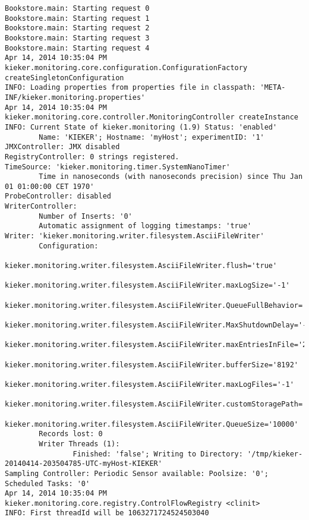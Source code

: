 \setTextListing
\begin{lstlisting}[caption=Execution of the Bookstore with AspectJ trace instrumentation (Section~\ref{sec:traceAnalysis:instr:AspectJ})]
Bookstore.main: Starting request 0
Bookstore.main: Starting request 1
Bookstore.main: Starting request 2
Bookstore.main: Starting request 3
Bookstore.main: Starting request 4
Apr 14, 2014 10:35:04 PM kieker.monitoring.core.configuration.ConfigurationFactory createSingletonConfiguration
INFO: Loading properties from properties file in classpath: 'META-INF/kieker.monitoring.properties'
Apr 14, 2014 10:35:04 PM kieker.monitoring.core.controller.MonitoringController createInstance
INFO: Current State of kieker.monitoring (1.9) Status: 'enabled'
        Name: 'KIEKER'; Hostname: 'myHost'; experimentID: '1'
JMXController: JMX disabled
RegistryController: 0 strings registered.
TimeSource: 'kieker.monitoring.timer.SystemNanoTimer'
        Time in nanoseconds (with nanoseconds precision) since Thu Jan 01 01:00:00 CET 1970'
ProbeController: disabled
WriterController:
        Number of Inserts: '0'
        Automatic assignment of logging timestamps: 'true'
Writer: 'kieker.monitoring.writer.filesystem.AsciiFileWriter'
        Configuration:
                kieker.monitoring.writer.filesystem.AsciiFileWriter.flush='true'
                kieker.monitoring.writer.filesystem.AsciiFileWriter.maxLogSize='-1'
                kieker.monitoring.writer.filesystem.AsciiFileWriter.QueueFullBehavior='0'
                kieker.monitoring.writer.filesystem.AsciiFileWriter.MaxShutdownDelay='-1'
                kieker.monitoring.writer.filesystem.AsciiFileWriter.maxEntriesInFile='25000'
                kieker.monitoring.writer.filesystem.AsciiFileWriter.bufferSize='8192'
                kieker.monitoring.writer.filesystem.AsciiFileWriter.maxLogFiles='-1'
                kieker.monitoring.writer.filesystem.AsciiFileWriter.customStoragePath=''
                kieker.monitoring.writer.filesystem.AsciiFileWriter.QueueSize='10000'
        Records lost: 0
        Writer Threads (1): 
                Finished: 'false'; Writing to Directory: '/tmp/kieker-20140414-203504785-UTC-myHost-KIEKER'
Sampling Controller: Periodic Sensor available: Poolsize: '0'; Scheduled Tasks: '0'
Apr 14, 2014 10:35:04 PM kieker.monitoring.core.registry.ControlFlowRegistry <clinit>
INFO: First threadId will be 1063271724524503040
\end{lstlisting}


